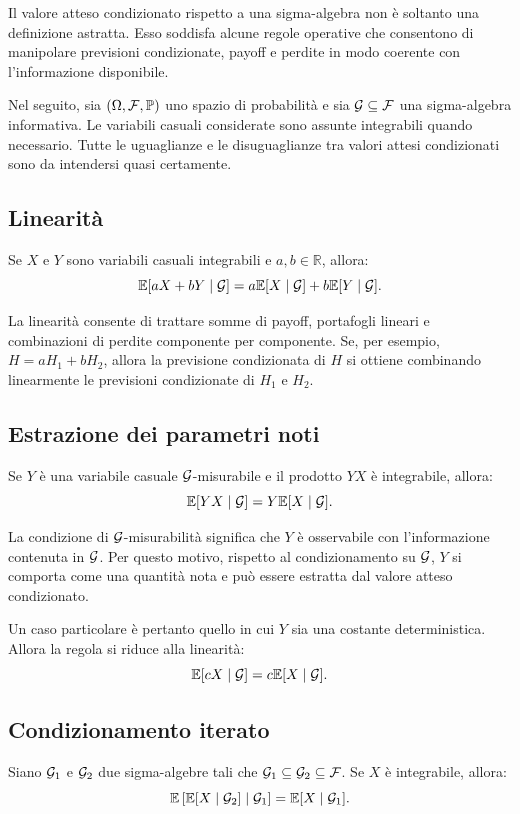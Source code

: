 Il valore atteso condizionato rispetto a una sigma-algebra non \`{e} soltanto
una definizione astratta. Esso soddisfa alcune regole operative che consentono
di manipolare previsioni condizionate, payoff e perdite in modo coerente con
l'informazione disponibile.

Nel seguito, sia $(\Omega,\mathcal{F},\mathbb{P})$ uno spazio di probabilit\`{a}
e sia $\mathcal{G}\subseteq\mathcal{F}$ una sigma-algebra informativa. Le
variabili casuali considerate sono assunte integrabili quando necessario.
Tutte le uguaglianze e le disuguaglianze tra valori attesi condizionati sono
da intendersi quasi certamente.

\subsection{Linearit\`{a}}

Se $X$ e $Y$ sono variabili casuali integrabili e $a,b\in\mathbb{R}$, allora:
\[
\mathbb{E}[aX+bY\mid\mathcal{G}]
=
a\mathbb{E}[X\mid\mathcal{G}]
+
b\mathbb{E}[Y\mid\mathcal{G}].
\]

La linearit\`{a} consente di trattare somme di payoff, portafogli lineari e
combinazioni di perdite componente per componente. Se, per esempio,
$H=aH_1+bH_2$, allora la previsione condizionata di $H$ si ottiene combinando
linearmente le previsioni condizionate di $H_1$ e $H_2$.

\subsection{Estrazione dei parametri noti}

Se $Y$ \`{e} una variabile casuale $\mathcal{G}$-misurabile e il prodotto $YX$
\`{e} integrabile, allora:
\[
\mathbb{E}[YX\mid\mathcal{G}]
=
Y\mathbb{E}[X\mid\mathcal{G}].
\]

La condizione di $\mathcal{G}$-misurabilit\`{a} significa che $Y$ \`{e}
osservabile con l'informazione contenuta in $\mathcal{G}$. Per questo motivo,
rispetto al condizionamento su $\mathcal{G}$, $Y$ si comporta come una
quantit\`{a} nota e pu\`{o} essere estratta dal valore atteso condizionato.

Un caso particolare \`{e} pertanto quello in cui $Y$ sia una costante deterministica.
Allora la regola si riduce alla linearit\`{a}:
\[
\mathbb{E}[cX\mid\mathcal{G}]
=
c\mathbb{E}[X\mid\mathcal{G}].
\]

\subsection{Condizionamento iterato}

Siano $\mathcal{G}_1$ e $\mathcal{G}_2$ due sigma-algebre tali che
$\mathcal{G}_1\subseteq\mathcal{G}_2\subseteq\mathcal{F}$. Se $X$ \`{e}
integrabile, allora:
\[
\mathbb{E}\left[
\mathbb{E}[X\mid\mathcal{G}_2]
\mid
\mathcal{G}_1
\right]
=
\mathbb{E}[X\mid\mathcal{G}_1].
\]

